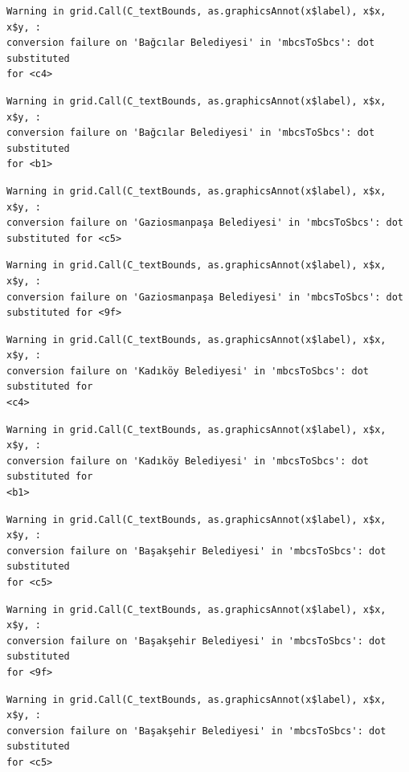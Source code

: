\documentclass[
  11pt,
  a4paper,
  DIV=11,
  numbers=noendperiod]{scrartcl}
\begin{document}
\begin{verbatim}
Warning in grid.Call(C_textBounds, as.graphicsAnnot(x$label), x$x, x$y, :
conversion failure on 'Bağcılar Belediyesi' in 'mbcsToSbcs': dot substituted
for <c4>
\end{verbatim}

\begin{verbatim}
Warning in grid.Call(C_textBounds, as.graphicsAnnot(x$label), x$x, x$y, :
conversion failure on 'Bağcılar Belediyesi' in 'mbcsToSbcs': dot substituted
for <b1>
\end{verbatim}

\begin{verbatim}
Warning in grid.Call(C_textBounds, as.graphicsAnnot(x$label), x$x, x$y, :
conversion failure on 'Gaziosmanpaşa Belediyesi' in 'mbcsToSbcs': dot
substituted for <c5>
\end{verbatim}

\begin{verbatim}
Warning in grid.Call(C_textBounds, as.graphicsAnnot(x$label), x$x, x$y, :
conversion failure on 'Gaziosmanpaşa Belediyesi' in 'mbcsToSbcs': dot
substituted for <9f>
\end{verbatim}

\begin{verbatim}
Warning in grid.Call(C_textBounds, as.graphicsAnnot(x$label), x$x, x$y, :
conversion failure on 'Kadıköy Belediyesi' in 'mbcsToSbcs': dot substituted for
<c4>
\end{verbatim}

\begin{verbatim}
Warning in grid.Call(C_textBounds, as.graphicsAnnot(x$label), x$x, x$y, :
conversion failure on 'Kadıköy Belediyesi' in 'mbcsToSbcs': dot substituted for
<b1>
\end{verbatim}

\begin{verbatim}
Warning in grid.Call(C_textBounds, as.graphicsAnnot(x$label), x$x, x$y, :
conversion failure on 'Başakşehir Belediyesi' in 'mbcsToSbcs': dot substituted
for <c5>
\end{verbatim}

\begin{verbatim}
Warning in grid.Call(C_textBounds, as.graphicsAnnot(x$label), x$x, x$y, :
conversion failure on 'Başakşehir Belediyesi' in 'mbcsToSbcs': dot substituted
for <9f>
\end{verbatim}

\begin{verbatim}
Warning in grid.Call(C_textBounds, as.graphicsAnnot(x$label), x$x, x$y, :
conversion failure on 'Başakşehir Belediyesi' in 'mbcsToSbcs': dot substituted
for <c5>
\end{verbatim}
\end{document}
